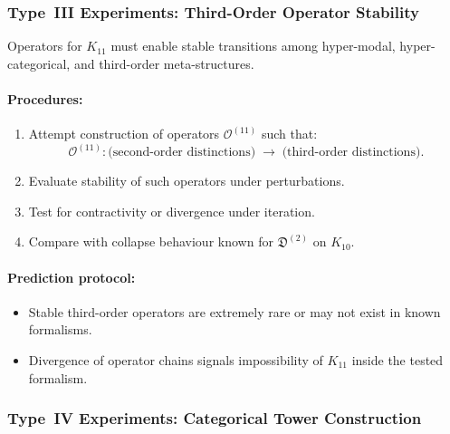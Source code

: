 \subsubsection{Type~III Experiments: Third-Order Operator Stability}

Operators for $K_{11}$ must enable stable transitions among
hyper-modal, hyper-categorical, and third-order meta-structures.

\paragraph{Procedures:}

\begin{enumerate}
    \item Attempt construction of operators $\mathcal{O}^{(11)}$
          such that:
          \[
              \mathcal{O}^{(11)} :
              \text{(second-order distinctions)}
                 \;\longrightarrow\;
              \text{(third-order distinctions)}.
          \]
    \item Evaluate stability of such operators under perturbations.
    \item Test for contractivity or divergence under iteration.
    \item Compare with collapse behaviour known for
          $\mathfrak{D}^{(2)}$ on $K_{10}$.
\end{enumerate}

\paragraph{Prediction protocol:}

\begin{itemize}
    \item Stable third-order operators are extremely rare or may not
          exist in known formalisms.
    \item Divergence of operator chains signals impossibility of
          $K_{11}$ inside the tested formalism.
\end{itemize}



\subsubsection{Type~IV Experiments: Categorical Tower Construction}

